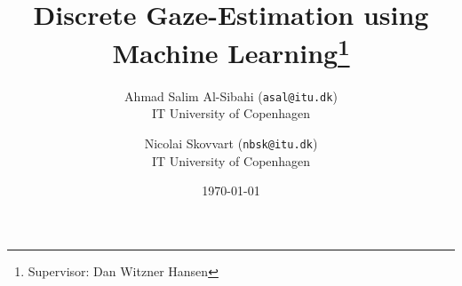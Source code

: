 \documentclass[a4paper]{article}%
\begin{document}
\title{Discrete Gaze-Estimation using Machine Learning\thanks{Supervisor: Dan Witzner Hansen}}
\author{Ahmad Salim Al-Sibahi (\texttt{asal@itu.dk})\\IT University of Copenhagen \and Nicolai Skovvart (\texttt{nbsk@itu.dk})\\IT University of Copenhagen}
\date{\today}


\maketitle



\tableofcontents



















\appendix


\end{document}
